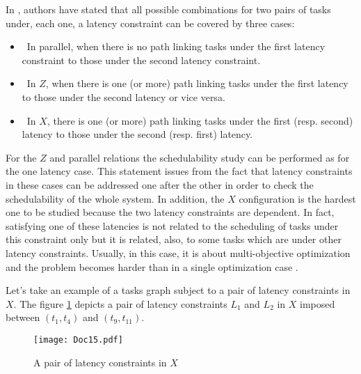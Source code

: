 \documentclass{ijcaArticle}
\begin{document}
In \cite{cucu04}, authors have stated that all possible combinations for two pairs of tasks under,
each one, a latency constraint can be covered by three cases:
\begin{itemize}
\item \ In parallel, when there is no path linking tasks under the first latency constraint to those under the second latency constraint.

\item  \ In $Z$, when there is one (or more) path linking tasks under the first latency to those under the second latency or vice versa. 
\item  \ In $X$, there is one (or more) path linking tasks under the first (resp. second) latency to those under the second (resp. first) latency. 
\end{itemize}
For the $Z$ and parallel relations the schedulability study can be performed as for the one latency case. This statement issues from the fact that latency constraints in these cases can be addressed one after the other in order to check the schedulability of the whole system. In addition, the $X$ configuration is the hardest one to be studied because the two latency constraints are dependent. In fact, satisfying one of these latencies is not related to the scheduling of tasks under this constraint only but it is related, also, to some tasks which are under other latency constraints. Usually, in this case, it is about multi-objective optimization and the problem becomes harder than in a single optimization case \cite{GlaBer:2010}.
 


Let's take an example of a tasks graph subject to  a pair of latency constraints in $X$. The figure \ref{fig-lat-crois} depicts a pair of latency constraints $L_1$ and $L_2$ in $X$ imposed between $(t_1,t_4)$ and $(t_9,t_{11})$.

\begin{figure}[h!] 
\begin{center} 
\texttt{[image: Doc15.pdf]} 
\caption{A pair of latency constraints in $X$} 
\label{fig-lat-crois} 
\end{center} 
\end{figure}
\end{document}

